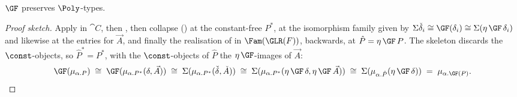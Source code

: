 \begin{proposition}[Preservation]
\label{prop:conservativity:gf-preserves-poly}
$\GF$ preserves $\Poly$-types.
\end{proposition}

\begin{proof}[Proof sketch]
Apply  in $\cat{C}$, then
, then collapse () at
the constant-free $P^{*}$, at the isomorphism family given by $\Sigma\check{\delta}_i \cong
\GF(\delta_i) \cong \Sigma(\eta\,\GF\,\delta_i)$ and likewise at the entries for
$\vec{A}$, and finally the realisation of  in $\Fam(\GLR(F))$,
backwards, at $\hat{P} = \eta\,\GF\,P$. The skeleton discards the $\const$-objects, so
$\hat{P}^{*} = P^{*}$, with the $\const$-objects of $\hat{P}$ the $\eta\,\GF$-images of
$\vec{A}$:
\[
  \GF(\mu_{\alpha.P})
  \;\cong\; \GF(\mu_{\alpha.P^{*}}(\delta, \vec{A}))
  \;\cong\; \Sigma(\mu_{\alpha.P^{*}}(\check{\delta}, \check{A}))
  \;\cong\; \Sigma(\mu_{\alpha.P^{*}}(\eta\,\GF\,\delta, \eta\,\GF\,\vec{A}))
  \;\cong\; \Sigma(\mu_{\alpha.\hat{P}}(\eta\,\GF\,\delta))
  \;=\; \mu_{\alpha.\GF(P)}.
\]
\end{proof}
